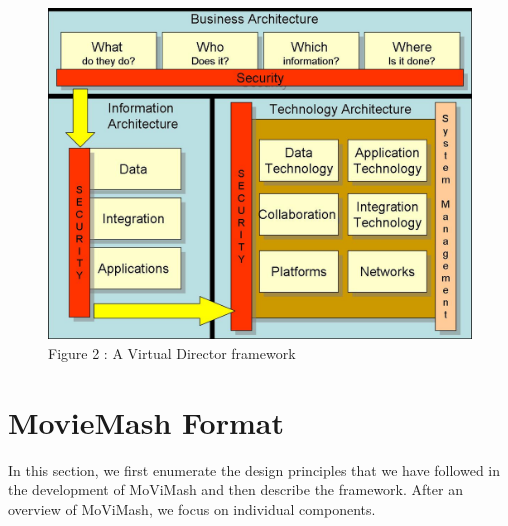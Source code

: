 \documentclass{sig-alternate}
\begin{document}
\begin{figure}
  \includegraphics[width=\linewidth]{Frame.jpg}
  \caption{Figure 2 : A Virtual Director framework}
  \label{Fig2}
\end{figure}
\section{MovieMash Format}
In this section, we first enumerate the design principles that we have followed in the development of MoViMash and then describe the framework. After an overview of MoViMash, we focus on individual components.
\end{document}

